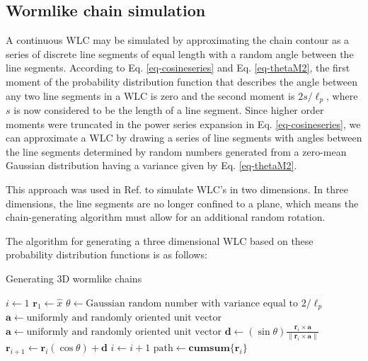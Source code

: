 \documentclass[12pt, a4paper]{article}
\begin{document}
\subsection{Wormlike chain simulation}
\label{sec-2-2}
A continuous WLC may be simulated by approximating the chain
contour as a series of discrete line segments of equal length with
a random angle between the line segments. According to
Eq. \eqref{eq-cosineseries} and Eq. \eqref{eq-thetaM2}, the first
moment of the probability distribution function that describes the
angle between any two line segments in a WLC is zero and the second
moment is $2s/\ell_p$, where $s$ is now considered to be the length
of a line segment. Since higher order moments were truncated in the
power series expansion in Eq. \eqref{eq-cosineseries}, we can
approximate a WLC by drawing a series of line segments with angles
between the line segments determined by random numbers generated
from a zero-mean Gaussian distribution having a variance given by
Eq. \eqref{eq-thetaM2}.

This approach was used in Ref. \cite{rivetti-jmolbiol-1996} to
simulate WLC's in two dimensions. In three dimensions, the line
segments are no longer confined to a plane, which means the
chain-generating algorithm must allow for an additional random
rotation.

The algorithm for generating a three dimensional WLC based on
these probability distribution functions is as follows:

\begin{algorithm}
  \caption{Generating 3D wormlike chains}
  \label{alg-3dWLC}
  \begin{algorithmic}[1]
    \Statex
    \State $i\gets 1$
    \State $\mathbf{r}_1\gets \hat{x}$ 
      \State $\theta\gets \text{Gaussian random number with variance equal to } 2/\ell_{p}$
      \State $\mathbf{a}\gets \text{uniformly and randomly oriented unit vector}$
      \Statex
        \State $\mathbf{a}\gets \text{uniformly and randomly oriented unit vector}$
      \EndWhile
    \Statex
    \State $\mathbf{d}\gets \left( \sin \theta \right) \frac{\mathbf{r}_i \times \mathbf{a}}{\lVert \mathbf{r}_i \times \mathbf{a} \rVert}$ 
    \State $\mathbf{r}_{i+1}\gets \mathbf{r}_i \left( \cos \theta \right) + \mathbf{d}$
    \State $i\gets i + 1$
    \EndWhile
    \Statex 
    \State $\text{path} \gets \mathbf{cumsum} \{ \mathbf{r}_i \}$ 
  \end{algorithmic}
\end{algorithm}
\end{document}
